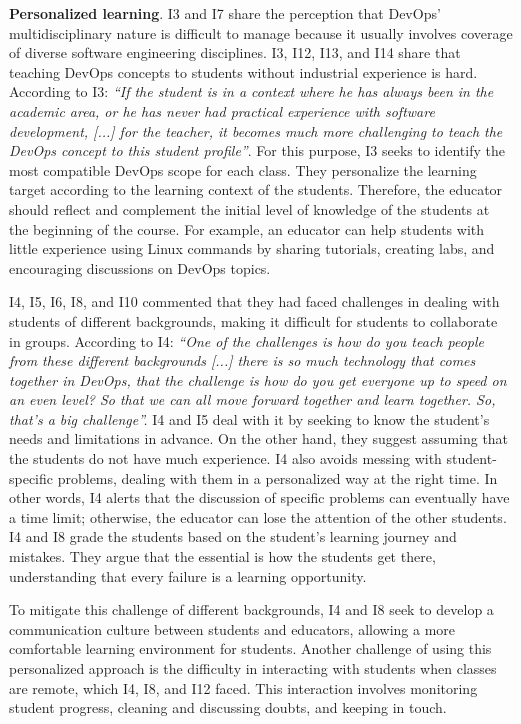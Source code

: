 \documentclass[10pt,conference]{IEEEtran}
\begin{document}
{\textbf{Personalized learning}.} I3 and I7 share the perception that DevOps' multidisciplinary nature is difficult to manage because it usually involves coverage of diverse software engineering disciplines. I3, I12, I13, and I14 share that teaching DevOps concepts to students without industrial experience is hard. According to I3: \textit{``If the student is in a context where he has always been in the academic area, or he has never had practical experience with software development, [...] for the teacher, it becomes much more challenging to teach the DevOps concept to this student profile''}. For this purpose, I3 seeks to identify the most compatible DevOps scope for each class. They personalize the learning target according to the learning context of the students. Therefore, the educator should reflect and complement the initial level of knowledge of the students at the beginning of the course. For example, an educator can help students with little experience using Linux commands by sharing tutorials, creating labs, and encouraging discussions on DevOps topics.


I4, I5, I6, I8, and I10 commented that they had faced challenges in dealing with students of different backgrounds, making it difficult for students to collaborate in groups. According to I4: \textit{``One of the challenges is how do you teach people from these different backgrounds [...]  there is so much technology that comes together in DevOps, that the challenge is how do you get everyone up to speed on an even level? So that we can all move forward together and learn together. So, that's a big challenge''.} I4 and I5 deal with it by seeking to know the student's needs and limitations in advance. On the other hand, they suggest assuming that the students do not have much experience. I4 also avoids messing with student-specific problems, dealing with them in a personalized way at the right time. In other words, I4 alerts that the discussion of specific problems can eventually have a time limit; otherwise, the educator can lose the attention of the other students. I4 and I8 grade the students based on the student's learning journey and mistakes. They argue that the essential is how the students get there, understanding that every failure is a learning opportunity.


To mitigate this challenge of different backgrounds, I4 and I8 seek to develop a communication culture between students and educators, allowing a more comfortable learning environment for students. Another challenge of using this personalized approach is the difficulty in interacting with students when classes are remote, which I4, I8, and I12 faced. This interaction involves monitoring student progress, cleaning and discussing doubts, and keeping in touch.
\end{document}
